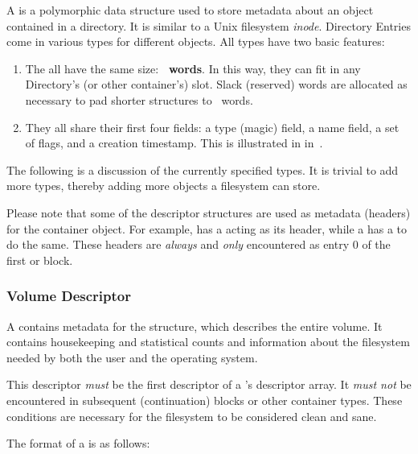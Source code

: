 A  is a polymorphic data structure used to store metadata about
an object contained in a directory. It is similar to a Unix filesystem {\em
  inode\/}. Directory Entries come in various types for different objects. All
types have two basic features:

\begin{enumerate}
  \item The all have the same size: \textbf{\DescriptorSize~words}. In this
    way, they can fit in any Directory's (or other container's) 
    slot. Slack (reserved) words are allocated as necessary to pad shorter
    structures to \DescriptorSize~words.
  \item They all share their first four fields: a type (magic) field, a name
    field, a set of flags, and a creation timestamp. This is illustrated in
    in~.
\end{enumerate}

The following is a discussion of the currently specified 
types. It is trivial to add more types, thereby adding more objects a
filesystem can store.

Please note that some of the  descriptor structures are used as
metadata (headers) for the container object. For example,  has a
 acting as its header, while a  has a 
to do the same. These headers are {\em always\/} and {\em only\/} encountered
as entry 0 of the first  or  block.

\subsubsection{Volume Descriptor}
\label{sec:fs-voldesc}

A  contains metadata for the  structure, which
describes the entire volume. It contains housekeeping and statistical counts
and information about the filesystem needed by both the user and the operating
system.

This descriptor {\em must\/} be the first descriptor of a 's
descriptor array. It {\em must not\/} be encountered in subsequent
(continuation) blocks or other container types. These conditions are necessary
for the filesystem to be considered clean and sane.

The format of a  is as follows:

